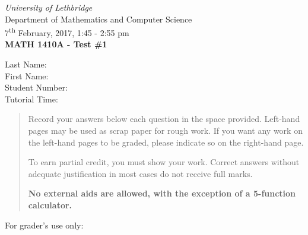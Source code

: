 \documentclass[12pt]{article}
\newcommand{\skipline}{\vspace{12pt}}
\begin{document}
\author{Instructor: Sean Fitzpatrick}
\thispagestyle{plain}
\begin{center}
\emph{University of Lethbridge}\\
Department of Mathematics and Computer Science\\
7\textsuperscript{th} February, 2017, 1:45 - 2:55 pm\\
{\bf MATH 1410A - Test \#1}\\
\end{center}
\skipline \skipline \skipline \noindent \skipline
Last Name:\underline{\hspace{50pt}{\bf Solutions}\hspace{248pt}}\\
\skipline
First Name:\underline{\hspace{50pt}{\bf The}\hspace{275pt}}\\
\skipline
Student Number:\underline{\hspace{323pt}}\\
\skipline
Tutorial Time: \underline{\hspace{320pt}}\\


\vspace{0.5in}


\begin{quote}
  Record your answers below each question in the space provided.    Left-hand pages may be used as scrap paper for rough work.  If you want any work on the left-hand pages to be graded, please indicate so on the right-hand page.
 
 \bigskip
 
To earn partial credit, you must show your work. Correct answers without adequate justification in most cases do not receive full marks.

\bigskip

{\bf No external aids are allowed, with the exception of a 5-function calculator.}
\end{quote}


\vspace{0.5in}

For grader's use only:
\end{document}

